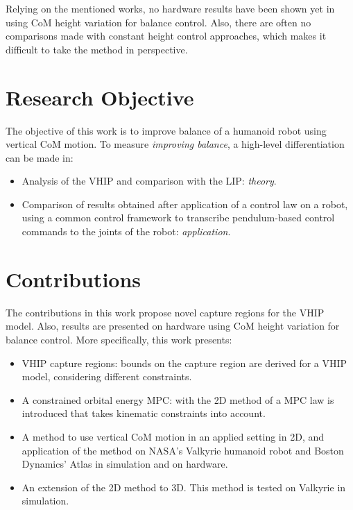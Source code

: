 Relying on the mentioned works, no hardware results have been shown yet in using \ac{CoM} height variation for balance control. Also, there are often no comparisons made with constant height control approaches, which makes it difficult to take the method in perspective.

\section{Research Objective}
The objective of this work is to improve balance of a humanoid robot using vertical \ac{CoM} motion. To measure \textit{improving balance}, a high-level differentiation can be made in:
\begin{itemize}
	\item Analysis of the \ac{VHIP} and comparison with the \ac{LIP}: \textit{theory}.
	\item Comparison of results obtained after application of a control law on a robot, using a common control framework to transcribe pendulum-based control commands to the joints of the robot: \textit{application}.
\end{itemize}

\section{Contributions}
The contributions in this work propose novel capture regions for the \ac{VHIP} model. Also, results are presented on hardware using \ac{CoM} height variation for balance control. More specifically, this work presents:
\begin{itemize}
	\item \ac{VHIP} capture regions: bounds on  the capture region are derived for a \ac{VHIP} model, considering different constraints.
      \item A constrained orbital energy \ac{MPC}: with the \ac{2D} method of \cite{koolen2016balance} a \ac{MPC} law is introduced that takes kinematic constraints into account.
	\item A method to use vertical \ac{CoM} motion in an applied setting in \ac{2D}, and application of the method on NASA's Valkyrie humanoid robot and Boston Dynamics' Atlas in simulation and on hardware.
	\item An extension of the \ac{2D} method to \ac{3D}. This method is tested on Valkyrie in simulation.
\end{itemize}
